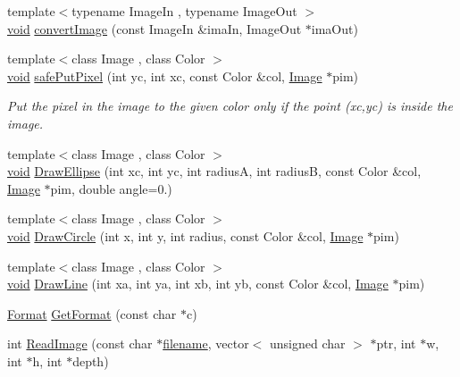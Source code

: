 \begin{DoxyCompactItemize}
\item 
{\footnotesize template$<$typename Image\+In , typename Image\+Out $>$ }\\\hyperlink{png_8h_aa8c59027f9ab2769342f248709d68d17}{void} \hyperlink{namespacelibs_a3448c04a1b0a918759084d8c8e618870}{convert\+Image} (const Image\+In \&ima\+In, Image\+Out $\ast$ima\+Out)
\item 
{\footnotesize template$<$class Image , class Color $>$ }\\\hyperlink{png_8h_aa8c59027f9ab2769342f248709d68d17}{void} \hyperlink{namespacelibs_a14b29acc45157fff570b889e3ad29115}{safe\+Put\+Pixel} (int yc, int xc, const Color \&col, \hyperlink{classImage}{Image} $\ast$pim)
\begin{DoxyCompactList}\small\item\em Put the pixel in the image to the given color only if the point (xc,yc) is inside the image. \end{DoxyCompactList}\item 
{\footnotesize template$<$class Image , class Color $>$ }\\\hyperlink{png_8h_aa8c59027f9ab2769342f248709d68d17}{void} \hyperlink{namespacelibs_a0bfb3ff08fcfc98a84bc99fc4a5c25c6}{Draw\+Ellipse} (int xc, int yc, int radius\+A, int radius\+B, const Color \&col, \hyperlink{classImage}{Image} $\ast$pim, double angle=0.)
\item 
{\footnotesize template$<$class Image , class Color $>$ }\\\hyperlink{png_8h_aa8c59027f9ab2769342f248709d68d17}{void} \hyperlink{namespacelibs_a0932bd20f2ca46688bfcc4da060664af}{Draw\+Circle} (int x, int y, int radius, const Color \&col, \hyperlink{classImage}{Image} $\ast$pim)
\item 
{\footnotesize template$<$class Image , class Color $>$ }\\\hyperlink{png_8h_aa8c59027f9ab2769342f248709d68d17}{void} \hyperlink{namespacelibs_a80cf97f96ad723948281afa5e66f942c}{Draw\+Line} (int xa, int ya, int xb, int yb, const Color \&col, \hyperlink{classImage}{Image} $\ast$pim)
\item 
\hyperlink{namespacelibs_a85e30cf7dbcb94a3d5e3bd5caf31c752}{Format} \hyperlink{namespacelibs_ab1c6acb4edc87092a77e374b1f60437d}{Get\+Format} (const char $\ast$c)
\item 
int \hyperlink{namespacelibs_a22deb9b91e45d9bdd4c133844a9b3628}{Read\+Image} (const char $\ast$\hyperlink{cdjpeg_8h_a47b60f696fdf746577cdf42ed791c264}{filename}, vector$<$ unsigned char $>$ $\ast$ptr, int $\ast$w, int $\ast$h, int $\ast$depth)

\end{DoxyCompactItemize}
